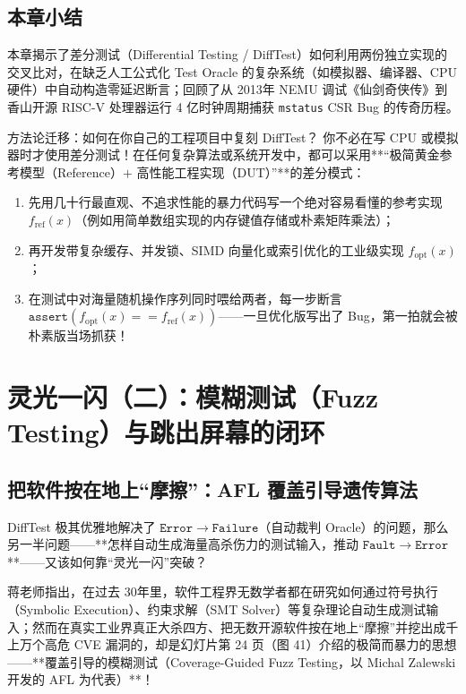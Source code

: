 \documentclass[a4paper]{article}
\begin{document}
\subsection{本章小结}

本章揭示了差分测试（Differential Testing / DiffTest）如何利用两份独立实现的交叉比对，在缺乏人工公式化 Test Oracle 的复杂系统（如模拟器、编译器、CPU 硬件）中自动构造零延迟断言；回顾了从 2013年 NEMU 调试《仙剑奇侠传》到香山开源 RISC-V 处理器运行 4 亿时钟周期捕获 \texttt{mstatus} CSR Bug 的传奇历程。

\begin{knowledgebox}{方法论迁移：如何在你自己的工程项目中复刻 DiffTest？}
你不必在写 CPU 或模拟器时才使用差分测试！在任何复杂算法或系统开发中，都可以采用**“极简黄金参考模型（Reference）$+$ 高性能工程实现（DUT）”**的差分模式：
\begin{enumerate}
    \item 先用几十行最直观、不追求性能的暴力代码写一个绝对容易看懂的参考实现 $f_{\mathrm{ref}}(x)$（例如用简单数组实现的内存键值存储或朴素矩阵乘法）；
    \item 再开发带复杂缓存、并发锁、SIMD 向量化或索引优化的工业级实现 $f_{\mathrm{opt}}(x)$；
    \item 在测试中对海量随机操作序列同时喂给两者，每一步断言 $\mathtt{assert}(f_{\mathrm{opt}}(x) == f_{\mathrm{ref}}(x))$——一旦优化版写出了 Bug，第一拍就会被朴素版当场抓获！
\end{enumerate}
\end{knowledgebox}

\section{灵光一闪（二）：模糊测试（Fuzz Testing）与跳出屏幕的闭环}

\subsection{把软件按在地上“摩擦”：AFL 覆盖引导遗传算法}

DiffTest 极其优雅地解决了 $\mathtt{Error \to Failure}$（自动裁判 Oracle）的问题，那么另一半问题——**怎样自动生成海量高杀伤力的测试输入，推动 $\mathtt{Fault \to Error}$**——又该如何靠“灵光一闪”突破？

蒋老师指出，在过去 30年里，软件工程界无数学者都在研究如何通过符号执行（Symbolic Execution）、约束求解（SMT Solver）等复杂理论自动生成测试输入；然而在真实工业界真正大杀四方、把无数开源软件按在地上“摩擦”并挖出成千上万个高危 CVE 漏洞的，却是幻灯片第 24 页（图 41）介绍的极简而暴力的思想——**覆盖引导的模糊测试（Coverage-Guided Fuzz Testing，以 Michal Zalewski 开发的 AFL 为代表）**！
\end{document}
